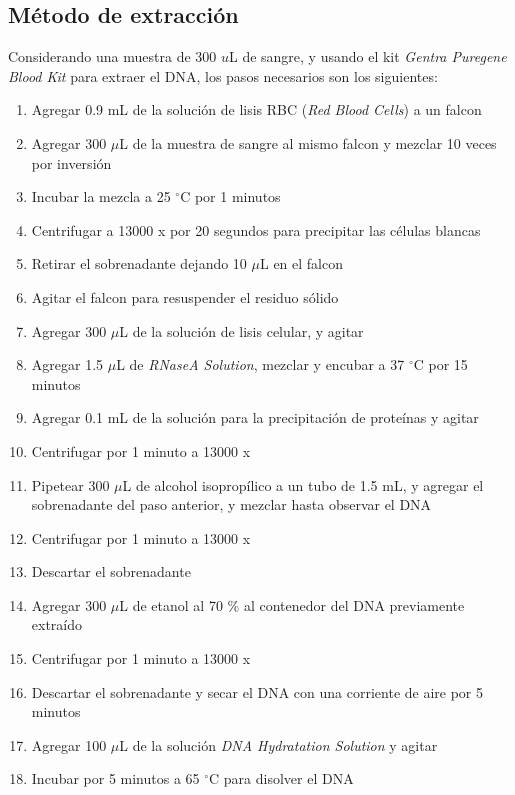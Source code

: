 \documentclass[12pt]{article}
\begin{document}
		\subsection{M\'etodo de extracci\'on}
			Considerando una muestra de 300 $u$L de sangre, y usando el kit \textit{Gentra Puregene Blood Kit} para extraer el DNA, los pasos necesarios son los siguientes:
			\begin{enumerate}[label=\color{blue}\theenumi]
				\item Agregar 0.9 mL de la soluci\'on de lisis RBC (\textit{Red Blood Cells}) a un falcon
				\item Agregar 300 $\mu$L de la muestra de sangre al mismo falcon y mezclar 10 veces por inversi\'on
				\item Incubar la mezcla a 25 $^\circ$C por 1 minutos
				\item Centrifugar a 13000 x por 20 segundos para precipitar las c\'elulas blancas
				\item Retirar el sobrenadante dejando 10 $\mu$L en el falcon
				\item Agitar el falcon para resuspender el residuo s\'olido
				\item Agregar 300 $\mu$L de la soluci\'on de lisis celular, y agitar
				\item Agregar 1.5 $\mu$L de \textit{RNaseA Solution}, mezclar y encubar a 37 $^\circ$C por 15 minutos
				\item Agregar 0.1 mL de la soluci\'on para la precipitaci\'on de prote\'inas y agitar
				\item Centrifugar por 1 minuto a 13000 x
				\item Pipetear 300 $\mu$L de alcohol isoprop\'ilico a un tubo de 1.5 mL, y agregar el sobrenadante del paso anterior, y mezclar hasta observar el DNA
				\item Centrifugar por 1 minuto a 13000 x
				\item Descartar el sobrenadante
				\item Agregar 300 $\mu$L de etanol al 70 \% al contenedor del DNA previamente extra\'ido
				\item Centrifugar por 1 minuto a 13000 x
				\item Descartar el sobrenadante y secar el DNA con una corriente de aire por 5 minutos
				\item Agregar 100 $\mu$L de la soluci\'on \textit{DNA Hydratation Solution} y agitar
				\item Incubar por 5 minutos a 65 $^\circ$C para disolver el DNA
			\end{enumerate}
			
\end{document}
